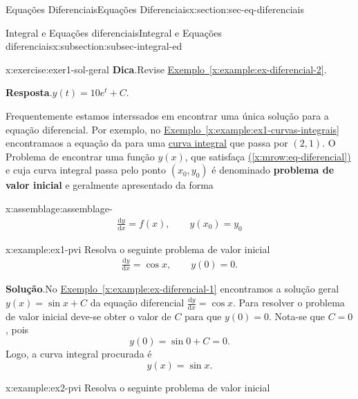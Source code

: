 \documentclass[oneside,10pt,]{article}
\newcommand{\blocktitlefont}{\relax}
\newcommand{\xreffont}{\relax}
\newcommand{\terminology}[1]{\textbf{#1}}
\numberwithin{equation}{section}
\newcommand{\dd}{\mathrm{d}}
\begin{document}
\begin{sectionptx}{Equações Diferenciais}{}{Equações Diferenciais}{}{}{x:section:sec-eq-diferenciais}
\begin{subsectionptx}{Integral e Equações diferenciais}{}{Integral e Equações diferenciais}{}{}{x:subsection:subsec-integral-ed}
\begin{inlineexercise}{}{x:exercise:exer1-sol-geral}
\noindent\textbf{\blocktitlefont Dica}.\hypertarget{g:hint:idp70}{}\quad{}Revise \hyperref[x:example:ex-diferencial-2]{Exemplo~{\xreffont\ref{x:example:ex-diferencial-2}}}.%
\par\smallskip%
\noindent\textbf{\blocktitlefont Resposta}.\hypertarget{g:answer:idp71}{}\quad{}\(y(t)= 10e^t + C\).%
\end{inlineexercise}
Frequentemente estamos interssados em encontrar uma única solução para a  equação diferencial. Por exemplo, no \hyperref[x:example:ex1-curvas-integrais]{Exemplo~{\xreffont\ref{x:example:ex1-curvas-integrais}}} encontramaos a equação da para uma \hyperref[x:definition:curvas-integrais]{curva integral} que passa por \((2,1)\). O Problema de encontrar uma função    \(y(x)\), que satisfaça \hyperref[x:mrow:eq-diferencial]{({\xreffont\ref{x:mrow:eq-diferencial}})} e cuja curva integral passa pelo ponto \((x_0,y_0)\)  é denominado    \terminology{problema de valor inicial} e geralmente apresentado da forma \begin{assemblage}{}{x:assemblage:assemblage-}%
%
\begin{gather}
\frac{\dd y}{\dd x}=f(x), \qquad y(x_0)=y_0\label{x:mrow:eq-pvi}
\end{gather}
%
\end{assemblage}
%
\begin{example}{}{x:example:ex1-pvi}%
Resolva o seguinte problema de valor inicial%
\begin{gather*}
\frac{\dd y}{\dd x}=\cos{x}, \qquad y(0)=0 \text{.}
\end{gather*}
%
\par\smallskip%
\noindent\textbf{\blocktitlefont Solução}.\hypertarget{g:solution:idp72}{}\quad{}No \hyperref[x:example:ex-diferencial-1]{Exemplo~{\xreffont\ref{x:example:ex-diferencial-1}}} encontramos a solução geral \(y(x)=\sin{x}+C\) da equação diferencial \(\frac{\dd y}{\dd x}=\cos{x}\). Para resolver o problema de valor inicial deve-se obter o valor de \(C\) para que \(y(0)=0\). Nota-se que \(C=0\), pois%
\begin{equation*}
y(0)=\sin{0} + C=0\text{.}
\end{equation*}
Logo, a curva integral procurada é%
\begin{equation*}
y(x)=\sin{x}\text{.}
\end{equation*}
%
\end{example}
\begin{example}{}{x:example:ex2-pvi}%
Resolva o seguinte problema de valor inicial%
\begin{gather*}

\end{gather*}
\end{example}
\end{subsectionptx}
\end{sectionptx}
\end{document}
